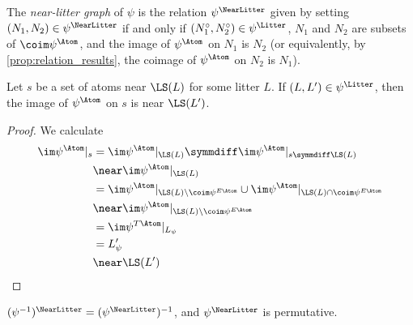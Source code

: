 \begin{definition}
  \label{def:nearLitterGraph}
  \leanok
  The \emph{near-litter graph} of \( \psi \) is the relation \( \psi^\NearLitter \) given by setting \( (N_1, N_2) \in \psi^\NearLitter \) if and only if \( (N_1^\circ, N_2^\circ) \in \psi^\Litter \), \( N_1 \) and \( N_2 \) are subsets of \( \coim \psi^\Atom \), and the image of \( \psi^\Atom \) on \( N_1 \) is \( N_2 \) (or equivalently, by \cref{prop:relation_results}, the coimage of \( \psi^\Atom \) on \( N_2 \) is \( N_1 \)).
\end{definition}
\begin{proposition}
  \label{prop:approx_near}
  \leanok
  Let \( s \) be a set of atoms near \( \LS(L) \) for some litter \( L \).
  If \( (L, L') \in \psi^\Litter \), then the image of \( \psi^\Atom \) on \( s \) is near \( \LS(L') \).
\end{proposition}
\begin{proof}
  \leanok
  We calculate
  \begin{align*}
    \im \psi^\Atom|_s
    &= \im \psi^\Atom|_{\LS(L)} \symmdiff \im \psi^\Atom|_{s \symmdiff \LS(L)} \\
    &\near \im \psi^\Atom|_{\LS(L)} \\
    &= \im \psi^\Atom|_{\LS(L) \setminus \coim \psi^{E\Atom}} \cup \im \psi^\Atom|_{\LS(L) \cap \coim \psi^{E\Atom}} \\
    &\near \im \psi^\Atom|_{\LS(L) \setminus \coim \psi^{E\Atom}} \\
    &= \im \psi^{T\Atom}|_{L_\psi} \\
    &= L'_\psi \\
    &\near \LS(L')
  \end{align*}
\end{proof}
\begin{proposition}
  \label{prop:nearLitterGraph_permutative}
  \leanok
  \( (\psi^{-1})^\NearLitter = (\psi^\NearLitter)^{-1} \), and \( \psi^\NearLitter \) is permutative.
\end{proposition}
